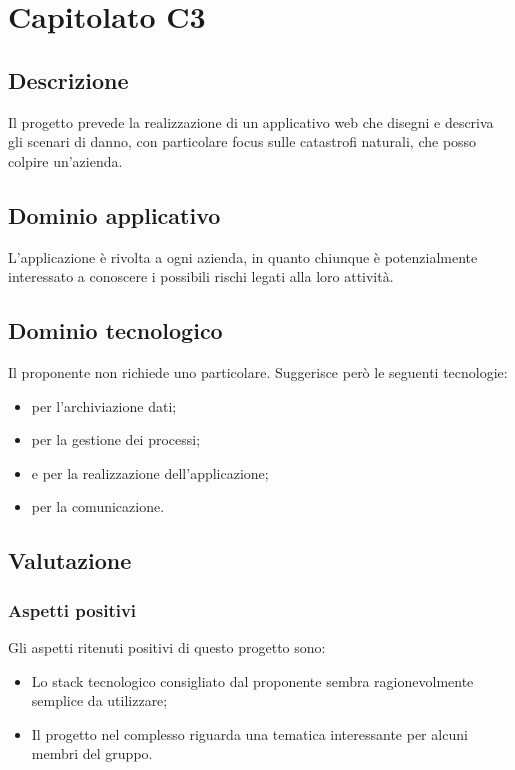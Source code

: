 \documentclass[../StudioDiFattibilita.tex]{subfiles}
\begin{document}
	\section{Capitolato C3}
		\subsection{Descrizione}
			Il progetto prevede la realizzazione di un applicativo web che disegni e descriva gli scenari di danno, con particolare focus sulle catastrofi naturali, che posso colpire un'azienda.
		\subsection{Dominio applicativo}
			L'applicazione è rivolta a ogni azienda, in quanto chiunque è potenzialmente interessato a conoscere i possibili rischi legati alla loro attività.
		\subsection{Dominio tecnologico} %
			Il proponente non richiede uno  particolare. Suggerisce però le seguenti tecnologie:
			\begin{itemize}
				\item \textbf{} per l'archiviazione dati;
				\item \textbf{} per la gestione dei processi;
				\item \textbf{} e \textbf{} per la realizzazione dell'applicazione;
				\item \textbf{} per la comunicazione.
			\end{itemize}
		\subsection{Valutazione}
			\subsubsection{Aspetti positivi}
				Gli aspetti ritenuti positivi di questo progetto sono:
				\begin{itemize}
					\item Lo stack tecnologico consigliato dal proponente sembra ragionevolmente semplice da utilizzare;
					\item Il progetto nel complesso riguarda una tematica interessante per alcuni membri del gruppo.
				\end{itemize}					
\end{document}
